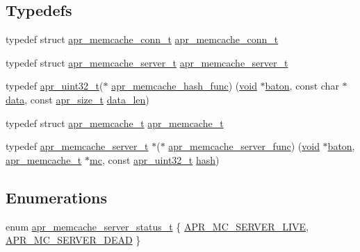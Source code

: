 \subsection*{Typedefs}
\begin{DoxyCompactItemize}
\item 
typedef struct \hyperlink{structapr__memcache__conn__t}{apr\+\_\+memcache\+\_\+conn\+\_\+t} \hyperlink{group__APR__Util__MC_gac4fabf6e3b3efb959eca48f473b73825}{apr\+\_\+memcache\+\_\+conn\+\_\+t}
\item 
typedef struct \hyperlink{structapr__memcache__server__t}{apr\+\_\+memcache\+\_\+server\+\_\+t} \hyperlink{group__APR__Util__MC_gaa7b43f2275de0fc700cc05e2467bbc4b}{apr\+\_\+memcache\+\_\+server\+\_\+t}
\item 
typedef \hyperlink{group__apr__platform_ga558548a135d8a816c4787250744ea147}{apr\+\_\+uint32\+\_\+t}($\ast$ \hyperlink{group__APR__Util__MC_ga61c818502b23997917b731adff0f4d27}{apr\+\_\+memcache\+\_\+hash\+\_\+func}) (\hyperlink{group__MOD__ISAPI_gacd6cdbf73df3d9eed42fa493d9b621a6}{void} $\ast$\hyperlink{group__APR__Util__RC_ga37840dc44e2b0b5a127a6828fffe2a8c}{baton}, const char $\ast$\hyperlink{structdata}{data}, const \hyperlink{group__apr__platform_gaaa72b2253f6f3032cefea5712a27540e}{apr\+\_\+size\+\_\+t} \hyperlink{group__APR__Util__RC_ga371e964d98d4000f4bc080fa4ad81902}{data\+\_\+len})
\item 
typedef struct \hyperlink{structapr__memcache__t}{apr\+\_\+memcache\+\_\+t} \hyperlink{group__APR__Util__MC_ga5bec59e17d9a29de2ffb38afae165371}{apr\+\_\+memcache\+\_\+t}
\item 
typedef \hyperlink{structapr__memcache__server__t}{apr\+\_\+memcache\+\_\+server\+\_\+t} $\ast$($\ast$ \hyperlink{group__APR__Util__MC_ga483e49c8fe3b82c5b54bae92503f0a0a}{apr\+\_\+memcache\+\_\+server\+\_\+func}) (\hyperlink{group__MOD__ISAPI_gacd6cdbf73df3d9eed42fa493d9b621a6}{void} $\ast$\hyperlink{group__APR__Util__RC_ga37840dc44e2b0b5a127a6828fffe2a8c}{baton}, \hyperlink{structapr__memcache__t}{apr\+\_\+memcache\+\_\+t} $\ast$\hyperlink{group__APR__Util__MC_ga1cf8c9d89cfb411f224cae715e8c2aaa}{mc}, const \hyperlink{group__apr__platform_ga558548a135d8a816c4787250744ea147}{apr\+\_\+uint32\+\_\+t} \hyperlink{testpass_8c_adfc0cb134ace18ba7fde0fefbae7a391}{hash})
\end{DoxyCompactItemize}
\subsection*{Enumerations}
\begin{DoxyCompactItemize}
\item 
enum \hyperlink{group__APR__Util__MC_ga3b18c7c3f0ecabb930b78aa549c2e2e8}{apr\+\_\+memcache\+\_\+server\+\_\+status\+\_\+t} \{ \hyperlink{group__APR__Util__MC_gga3b18c7c3f0ecabb930b78aa549c2e2e8a211c8d3d7a4a187b5c8f936a6929d007}{A\+P\+R\+\_\+\+M\+C\+\_\+\+S\+E\+R\+V\+E\+R\+\_\+\+L\+I\+VE}, 
\hyperlink{group__APR__Util__MC_gga3b18c7c3f0ecabb930b78aa549c2e2e8a6dffa918006f926e0fdf0074f4bdac28}{A\+P\+R\+\_\+\+M\+C\+\_\+\+S\+E\+R\+V\+E\+R\+\_\+\+D\+E\+AD}
 \}
\end{DoxyCompactItemize}
